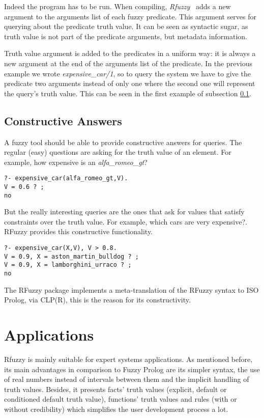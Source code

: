 \documentclass[runningheads,a4paper]{llncs}
\begin{document}
Indeed the program has to be run. 
When compiling, {\it Rfuzzy\ } adds a new argument to the 
arguments list of each fuzzy predicate.
This argument serves for querying about the predicate truth value.
It can be seen as syntactic sugar, 
as truth value is not part of the predicate arguments, 
but metadata information. 

Truth value argument is added to the predicates in a uniform way:
it is always a new argument at the end of the arguments list of the predicate.
In the previous example we wrote {\it expensive\_car/1}, so to query 
the system we have to give the predicate two arguments instead of only one
where the second one will represent the query's truth value.
This can be seen in the first example of subsection \ref{constructive-answers}.

\subsection{Constructive Answers}
\label{constructive-answers}

A fuzzy tool
should be able to provide constructive answers for queries. The
regular (easy) questions are asking for the truth value of an
element. For example, how expensive is an {\it alfa\_romeo\_gt}?
\begin{verbatim}
?- expensive_car(alfa_romeo_gt,V).
V = 0.6 ? ;
no
\end{verbatim}
But the really interesting queries are the ones that ask for values
that satisfy constraints over the truth value. For example, which
cars are very expensive?. RFuzzy provides this constructive
functionality.
\begin{verbatim}
?- expensive_car(X,V), V > 0.8.
V = 0.9, X = aston_martin_bulldog ? ;
V = 0.9, X = lamborghini_urraco ? ;
no
\end{verbatim}

The RFuzzy package implements a meta-translation of the RFuzzy syntax
to ISO Prolog, via CLP(R), this is the reason for its
constructivity.



\section{Applications}

Rfuzzy is mainly suitable for expert systems applications.
As mentioned before, its main advantages in comparison to Fuzzy Prolog are 
its simpler syntax, the use of real numbers instead of intervals 
between them and the implicit handling of truth values.
Besides, it presents 
facts' truth values (explicit, default or conditioned default truth value), 
functions' truth values and rules (with or without credibility) 
which simplifies the user development process a lot.
\end{document}
